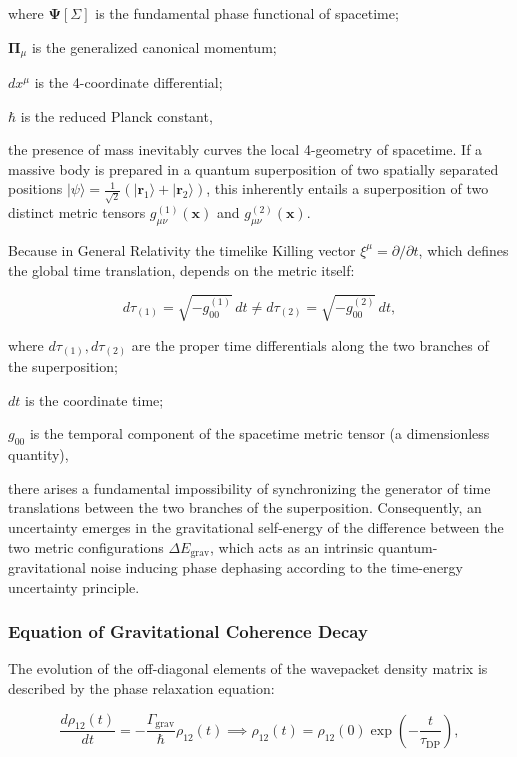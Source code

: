 \documentclass[11pt,a4paper]{article}
\theoremstyle{definition}
\begin{document}
where $\mathbf{\Psi}[\Sigma]$ is the fundamental phase functional of spacetime;  

$\mathbf{\Pi}_\mu$ is the generalized canonical momentum;  

$dx^\mu$ is the 4-coordinate differential;  

$\hbar$ is the reduced Planck constant,

the presence of mass inevitably curves the local 4-geometry of spacetime. If a massive body is prepared in a quantum superposition of two spatially separated positions $|\psi\rangle = \frac{1}{\sqrt{2}}(|\mathbf{r}_1\rangle + |\mathbf{r}_2\rangle)$, this inherently entails a superposition of two distinct metric tensors $g_{\mu\nu}^{(1)}(\mathbf{x})$ and $g_{\mu\nu}^{(2)}(\mathbf{x})$.

Because in General Relativity the timelike Killing vector $\xi^\mu = \partial / \partial t$, which defines the global time translation, depends on the metric itself:

\begin{equation}\label{eq:5.32}\tag{5.32}
d\tau_{(1)} = \sqrt{- g_{00}^{(1)}} \, dt \neq d\tau_{(2)} = \sqrt{- g_{00}^{(2)}} \, dt,
\end{equation}

where $d\tau_{(1)}, d\tau_{(2)}$ are the proper time differentials along the two branches of the superposition;  

$dt$ is the coordinate time;  

$g_{00}$ is the temporal component of the spacetime metric tensor (a dimensionless quantity),

there arises a fundamental impossibility of synchronizing the generator of time translations between the two branches of the superposition. Consequently, an uncertainty emerges in the gravitational self-energy of the difference between the two metric configurations $\Delta E_{\text{grav}}$, which acts as an intrinsic quantum-gravitational noise inducing phase dephasing according to the time-energy uncertainty principle.

\subsubsection{Equation of Gravitational Coherence Decay}\label{sec:5.2.2}

The evolution of the off-diagonal elements of the wavepacket density matrix is described by the phase relaxation equation:

\begin{equation}\label{eq:5.33}\tag{5.33}
\frac{d \rho_{12}(t)}{dt} = - \frac{\Gamma_{\text{grav}}}{\hbar} \rho_{12}(t) \implies \rho_{12}(t) = \rho_{12}(0) \exp\left( - \frac{t}{\tau_{\text{DP}}} \right),
\end{equation}
\end{document}
